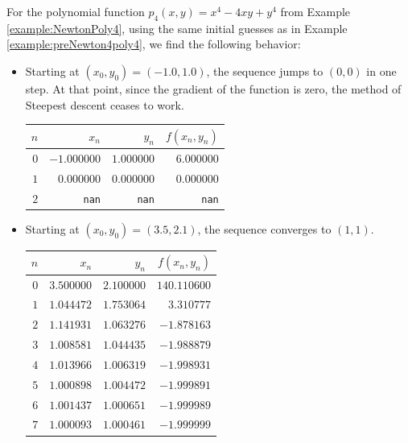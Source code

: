 \begin{example}
For the polynomial function $p_4(x,y) = x^4-4xy+y^4$ from Example \ref{example:NewtonPoly4}, using the same initial guesses as in Example \ref{example:preNewton4poly4}, we find the following behavior:
\begin{itemize}
	\item Starting at $(x_0, y_0) = (-1.0,1.0)$, the sequence jumps to $(0,0)$ in one step.  At that point, since the gradient of the function is zero, the method of Steepest descent ceases to work.
	\begin{center}
	\begin{tabular}{|r|r|r|r|} \hline 
	$n$ & $x_n$ & $y_n$ & $f(x_n,y_n)$ \\ \hline \hline 
	$0$ & $-1.000000$ & $1.000000$ & $6.000000$ \\ \hline 
	$1$ & $0.000000$ & $0.000000$ & $0.000000$ \\ \hline 
	$2$ & \texttt{nan} & \texttt{nan} & \texttt{nan} \\ \hline 
	\end{tabular}
	\end{center}
	\item Starting at $(x_0,y_0) = (3.5, 2.1)$, the sequence converges to $(1,1)$.
	\begin{center}
	\begin{tabular}{|r|r|r|r|} \hline 
	$n$ & $x_n$ & $y_n$ & $f(x_n,y_n)$ \\ \hline \hline 
	$0$ & $3.500000$ & $2.100000$ & $140.110600$ \\ \hline 
	$1$ & $1.044472$ & $1.753064$ & $3.310777$ \\ \hline 
	$2$ & $1.141931$ & $1.063276$ & $-1.878163$ \\ \hline 
	$3$ & $1.008581$ & $1.044435$ & $-1.988879$ \\ \hline 
	$4$ & $1.013966$ & $1.006319$ & $-1.998931$ \\ \hline 
	$5$ & $1.000898$ & $1.004472$ & $-1.999891$ \\ \hline 
	$6$ & $1.001437$ & $1.000651$ & $-1.999989$ \\ \hline 
	$7$ & $1.000093$ & $1.000461$ & $-1.999999$ \\ \hline 

\end{tabular}
\end{center}
\end{itemize}
\end{example}

